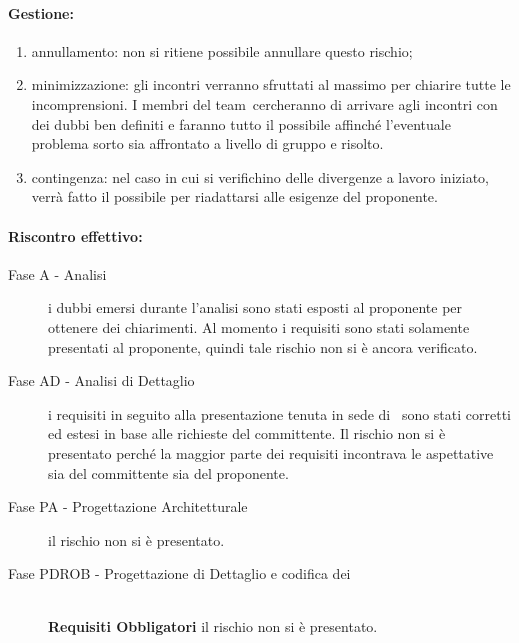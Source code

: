 \documentclass[../PianoProgetto.tex]{subfiles}
\begin{document}
	\paragraph*{Gestione:}
	\begin{enumerate}
		\item annullamento: non si ritiene possibile annullare questo rischio;
		\item minimizzazione: gli incontri verranno sfruttati al massimo per chiarire tutte le incomprensioni. I membri del team\g\ cercheranno di arrivare agli incontri con dei dubbi ben definiti e faranno tutto il possibile affinché l'eventuale problema sorto sia affrontato a livello di gruppo e risolto.
		\item contingenza: nel caso in cui si verifichino delle divergenze a lavoro iniziato, verrà fatto il possibile per riadattarsi alle esigenze del proponente.
	\end{enumerate}	
	
	
	\paragraph*{Riscontro effettivo:}
		\begin{description}
			\item[Fase A - Analisi] i dubbi emersi durante l'analisi sono stati esposti al proponente per ottenere dei chiarimenti. Al momento i requisiti sono stati solamente presentati al proponente, quindi tale rischio non si è ancora verificato.
			\item[Fase AD - Analisi di Dettaglio]  i requisiti in seguito alla presentazione tenuta in sede di \revisionedeirequisiti\ sono stati corretti ed estesi in base alle richieste del committente. Il rischio non si è presentato perché la maggior parte dei requisiti incontrava le aspettative sia del committente sia del proponente. 
			\item[Fase PA - Progettazione Architetturale] il rischio non si è presentato.
			\item[Fase PDROB - Progettazione di Dettaglio e codifica dei]  \ \\
					\textbf{Requisiti Obbligatori} il rischio non si è presentato.
		\end{description}

			
\end{document}
